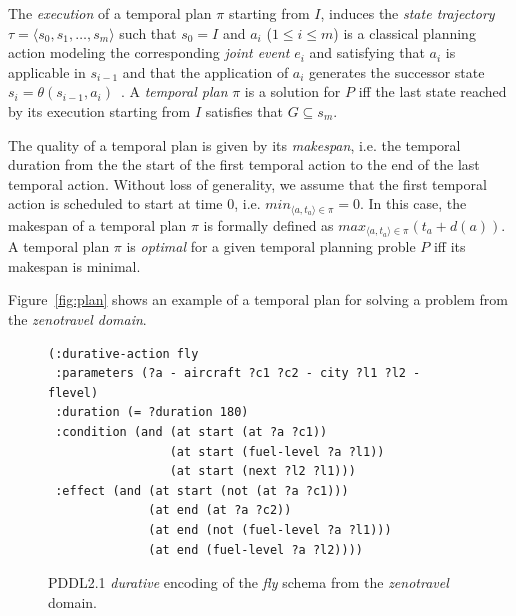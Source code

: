 \documentclass[letterpaper]{article} %
\newcommand{\tup}[1]{{\langle #1 \rangle}}
\begin{document}
The {\em execution} of a temporal plan $\pi$ starting from $I$, induces the {\em state trajectory} $\tau=\tup{s_0, s_1, \ldots, s_m}$ such that $s_0=I$ and $a_i$ ({\small $1\leq i\leq m$}) is a classical planning action modeling the corresponding {\em joint event} $e_i$ and satisfying that $a_i$ is applicable in $s_{i-1}$ and that the application of $a_i$ generates the successor state $s_i=\theta(s_{i-1},a_i)$~\cite{jimenez2015temporal}. A {\em temporal plan} $\pi$ is a solution for $P$ iff the last state reached by its execution starting from $I$ satisfies that $G\subseteq s_m$.

The quality of a temporal plan is given by its {\em makespan}, i.e. the temporal duration from the the start of the first temporal action to the end of the last temporal action. Without loss of generality, we assume that the first temporal action is scheduled to start at time 0, i.e. $min_{\tup{a,t_a}\in\pi}= 0$. In this case, the makespan of a temporal plan $\pi$ is formally defined as $max_{\tup{a,t_a}\in\pi}(t_a+d(a))$. A temporal plan $\pi$ is {\em optimal} for a given temporal planning proble $P$ iff its makespan is minimal.

Figure~\ref{fig:plan} shows an example of a temporal plan for solving a problem from the {\em zenotravel domain}.

\begin{figure}
	\begin{scriptsize}
		\begin{verbatim}
(:durative-action fly
 :parameters (?a - aircraft ?c1 ?c2 - city ?l1 ?l2 - flevel)
 :duration (= ?duration 180)
 :condition (and (at start (at ?a ?c1))
                 (at start (fuel-level ?a ?l1))
                 (at start (next ?l2 ?l1)))
 :effect (and (at start (not (at ?a ?c1)))
              (at end (at ?a ?c2))
              (at end (not (fuel-level ?a ?l1)))
              (at end (fuel-level ?a ?l2))))
		\end{verbatim}
	\end{scriptsize}
	\caption{PDDL2.1 {\em durative} encoding of the {\em fly} schema from the {\em zenotravel} domain.}
	\label{fig:flyt}
\end{figure}
\end{document}
